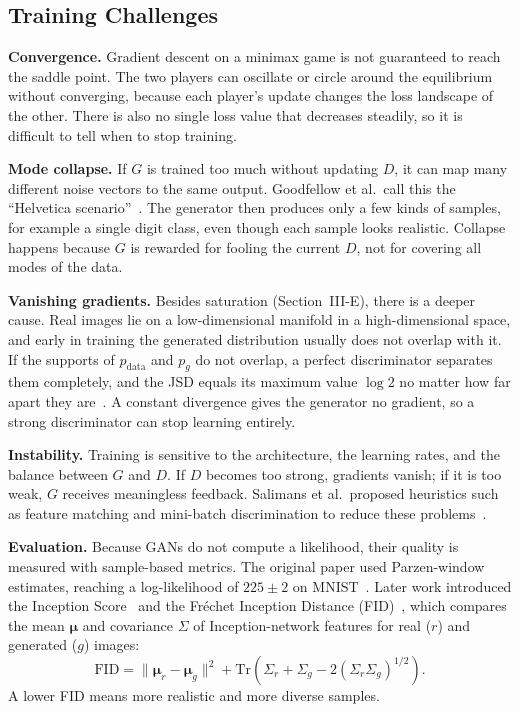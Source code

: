 \documentclass[conference]{IEEEtran}
\newcommand{\pdata}{p_{\mathrm{data}}}
\begin{document}
\subsection{Training Challenges}
\textbf{Convergence.} Gradient descent on a minimax game is not guaranteed to reach the saddle point. The two players can oscillate or circle around the equilibrium without converging, because each player's update changes the loss landscape of the other. There is also no single loss value that decreases steadily, so it is difficult to tell when to stop training.

\textbf{Mode collapse.} If $G$ is trained too much without updating $D$, it can map many different noise vectors to the same output. Goodfellow et al.\ call this the ``Helvetica scenario''~\cite{goodfellow2014}. The generator then produces only a few kinds of samples, for example a single digit class, even though each sample looks realistic. Collapse happens because $G$ is rewarded for fooling the current $D$, not for covering all modes of the data.

\textbf{Vanishing gradients.} Besides saturation (Section~III-E), there is a deeper cause. Real images lie on a low-dimensional manifold in a high-dimensional space, and early in training the generated distribution usually does not overlap with it. If the supports of $\pdata$ and $p_g$ do not overlap, a perfect discriminator separates them completely, and the JSD equals its maximum value $\log2$ no matter how far apart they are~\cite{arjovsky2017}. A constant divergence gives the generator no gradient, so a strong discriminator can stop learning entirely.

\textbf{Instability.} Training is sensitive to the architecture, the learning rates, and the balance between $G$ and $D$. If $D$ becomes too strong, gradients vanish; if it is too weak, $G$ receives meaningless feedback. Salimans et al.\ proposed heuristics such as feature matching and mini-batch discrimination to reduce these problems~\cite{salimans2016}.

\textbf{Evaluation.} Because GANs do not compute a likelihood, their quality is measured with sample-based metrics. The original paper used Parzen-window estimates, reaching a log-likelihood of $225\pm2$ on MNIST~\cite{goodfellow2014}. Later work introduced the Inception Score~\cite{salimans2016} and the Fréchet Inception Distance (FID)~\cite{heusel2017}, which compares the mean $\boldsymbol{\mu}$ and covariance $\Sigma$ of Inception-network features for real ($r$) and generated ($g$) images:
\begin{equation}
\mathrm{FID}=\|\boldsymbol{\mu}_r-\boldsymbol{\mu}_g\|^2+\mathrm{Tr}\!\left(\Sigma_r+\Sigma_g-2(\Sigma_r\Sigma_g)^{1/2}\right).
\end{equation}
A lower FID means more realistic and more diverse samples.
\end{document}

